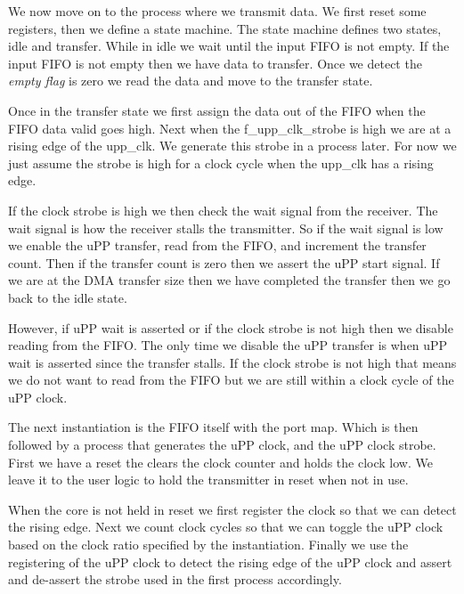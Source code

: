 We now move on to the process where we transmit data. We first reset some registers, then we define a state machine. The state machine defines two states, idle and transfer. While in idle we wait until the input \ac{FIFO} is not empty. If the input \ac{FIFO} is not empty then we have data to transfer. Once we detect the \emph{empty flag} is zero we read the data and move to the transfer state. 

Once in the transfer state we first assign the data out of the \ac{FIFO} when the \ac{FIFO} data valid goes high. Next when the f\_upp\_clk\_strobe is high we are at a rising edge of the upp\_clk. We generate this strobe in a process later. For now we just assume the strobe is high for a clock cycle when the upp\_clk has a rising edge. 

If the clock strobe is high we then check the wait signal from the receiver. The wait signal is how the receiver stalls the transmitter. So if the wait signal is low we enable the \ac{uPP} transfer, read from the \ac{FIFO}, and increment the transfer count. Then if the transfer count is zero then we assert the \ac{uPP} start signal. If we are at the \ac{DMA} transfer size then we have completed the transfer then we go back to the idle state. 

However, if \ac{uPP} wait is asserted or if the clock strobe is not high then we disable reading from the \ac{FIFO}. The only time we disable the \ac{uPP} transfer is when \ac{uPP} wait is asserted since the transfer stalls. If the clock strobe is not high that means we do not want to read from the \ac{FIFO} but we are still within a clock cycle of the \ac{uPP} clock. 

The next instantiation is the \ac{FIFO} itself with the port map. Which is then followed by a process that generates the \ac{uPP} clock, and the \ac{uPP} clock strobe. First we have a reset the clears the clock counter and holds the clock low. We leave it to the user logic to hold the transmitter in reset when not in use. 

When the core is not held in reset we first register the clock so that we can detect the rising edge. Next we count clock cycles so that we can toggle the \ac{uPP} clock based on the clock ratio specified by the instantiation. Finally we use the registering of the \ac{uPP} clock to detect the rising edge of the \ac{uPP} clock and assert and de-assert the strobe used in the first process accordingly.

